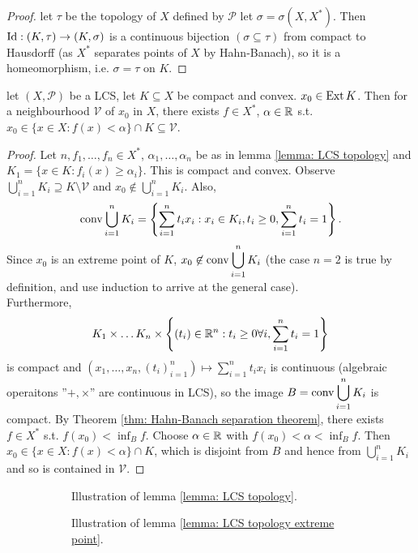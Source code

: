 \documentclass{article}
\begin{document}
\begin{proof}
    let $\tau$ be the topology of $X$ defined by $\mathcal{P}$ let $\sigma = \sigma(X, X^*)$. Then $\operatorname{Id}: (K,\tau)\to (K, \sigma)$ is a continuous bijection $(\sigma\subseteq\tau)$ from compact to Hausdorff (as $X^*$ separates points of $X$ by Hahn-Banach), so it is a homeomorphism, i.e. $\sigma = \tau$ on $K$.
    
\end{proof}

\begin{boxlemma}\label{lemma: LCS topology extreme point}
    let $(X, \mathcal{P})$ be a LCS, let $K\subseteq X$ be compact and convex. $x_0\in \operatorname{Ext} K$. Then for a neighbourhood $\mathcal{V}$ of $x_0$ in $X$, there exists $f\in X^*$, $\alpha\in \mathbb{R}$ s.t. $x_0\in \{x\in X: f(x)<\alpha\}\cap K\subseteq \mathcal{V}$.
\end{boxlemma}

\begin{proof}
    Let $n,f_1, \dots, f_n\in X^*$, $\alpha_1, \dots, \alpha_n$ be as in lemma \ref{lemma: LCS topology} and $K_1 = \{x\in K: f_i(x)\geq \alpha_i\}$. This is compact and convex. Observe $\displaystyle\bigcup^n_{i=1} K_i\supseteq K\setminus\mathcal{V}$ and $x_0\not\in \displaystyle\bigcup^n_{i=1} K_i$. Also, $$
    \operatorname{conv} \displaystyle\bigcup^n_{i=1} K_i = \left\{\displaystyle\sum^n_{i=1} t_ix_i: x_i\in K_i, t_i\geq 0, \displaystyle\sum^n_{i=1} t_i = 1\right\}.
    $$ 
    Since $x_0$ is an extreme point of $K$, $x_0\not\in \operatorname{conv} \displaystyle\bigcup^n_{i=1} K_i$ (the case $n=2$ is true by definition, and use induction to arrive at the general case).\\
    
    Furthermore, 
    $$
    K_1\times \dots K_n\times\left\{(t_i)\in \mathbb{R}^n: t_i\geq 0 \forall i, \displaystyle\sum^n_{i=1} t_i = 1\right\}
    $$ 
    is compact and $(x_1, \dots, x_n, (t_i)^n_{i=1})\mapsto \displaystyle\sum^n_{i=1} t_ix_i$ is continuous (algebraic operaitons ''$+,\times$'' are continuous in LCS), so the image $B = \operatorname{conv} \displaystyle\bigcup^n_{i=1} K_i$ is compact. By Theorem \ref{thm: Hahn-Banach separation theorem}, there exists $f\in X^*$ s.t. $f(x_0)<\displaystyle\inf_B f$. Choose $\alpha\in \mathbb{R}$ with $f(x_0)<\alpha<\displaystyle\inf_B f$. Then $x_0\in \{x\in X:f(x)<\alpha\}\cap K$, which is disjoint from $B$ and hence from $\displaystyle\bigcup^n_{i=1} K_i$ and so is contained in $\mathcal{V}$.
\end{proof}

\begin{figure}[H]
\begin{subfigure}{0.5\textwidth}
  \centering
  
  \caption{Illustration of lemma \ref{lemma: LCS topology}.}
  \label{fig: LCS topology}
\end{subfigure}%
\begin{subfigure}{0.5\textwidth}
  \centering
  
  \caption{Illustration of lemma \ref{lemma: LCS topology extreme point}.}
  \label{fig: LCS topology extreme point}
\end{subfigure}
\caption{}
\label{fig: LCS topology combined}
\end{figure}
\end{document}
